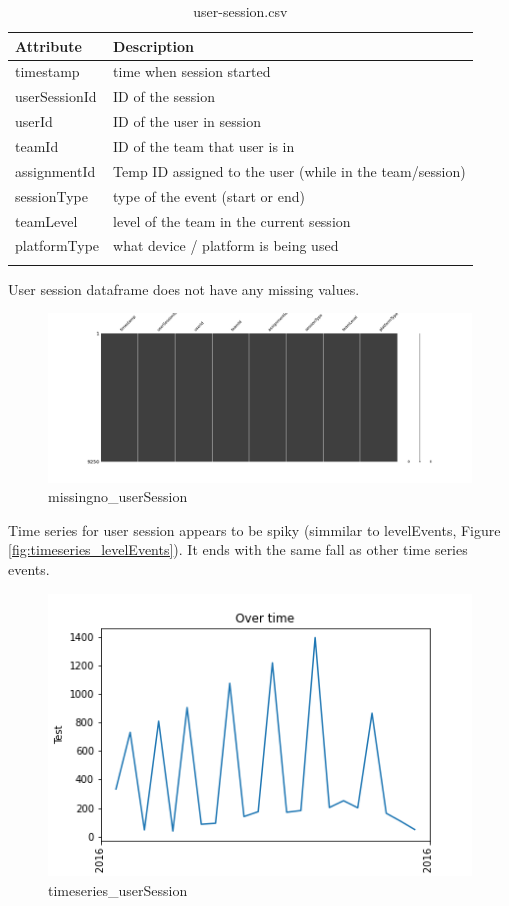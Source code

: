 \begin{center}
\begin{longtable}{ |l|l| } 
 \hline
 Attribute & Description\\ 
 \hline
 timestamp & time when session started\\ 
 \hline
 userSessionId & ID of the session\\ 
 \hline
 userId & ID of the user in session\\ 
 \hline
 teamId & ID of the team that user is in\\ 
 \hline
 assignmentId & Temp ID assigned to the user (while in the team/session)\\ 
 \hline
 sessionType & type of the event (start or end)\\ 
 \hline
 teamLevel & level of the team in the current session\\ 
 \hline
 platformType & what device / platform is being used\\ 
 \hline
\caption{user-session.csv}
\end{longtable}
\end{center}

User session dataframe does not have any missing values.
\begin{figure}[H]
\includegraphics[scale=0.25]{img/Graphs/userSession/missingno_userSession.png}
\centering
\caption{missingno\_userSession}
\label{fig:missingno_userSession}
\end{figure}

Time series for user session appears to be spiky (simmilar to levelEvents, Figure \ref{fig:timeseries_levelEvents}). It ends with the same fall as other time series events.
\begin{figure}[H]
\includegraphics[scale=0.85]{img/Graphs/userSession/timeseries_userSession.png}
\centering
\caption{timeseries\_userSession}
\label{fig:timeseries_userSession}
\end{figure}

